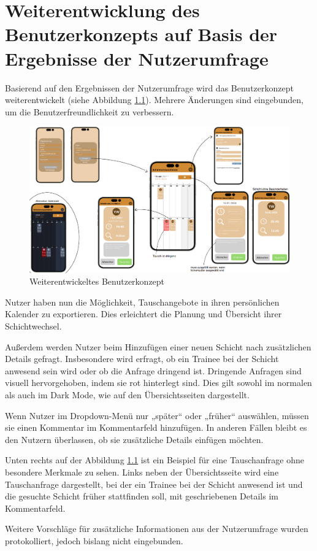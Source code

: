 \chapter{Weiterentwicklung des Benutzerkonzepts auf Basis der Ergebnisse der Nutzerumfrage}

Basierend auf den Ergebnissen der Nutzerumfrage wird das Benutzerkonzept weiterentwickelt (siehe Abbildung \ref{Bedienungskonzept_V2}). Mehrere Änderungen sind eingebunden, um die Benutzerfreundlichkeit zu verbessern.

\begin{figure}[h]
    \centering
    \includegraphics[clip,width=1\linewidth]{images/Bedienungskonzept_V2.png}
    \caption[Weiterentwickeltes Benutzerkonzept]{Weiterentwickeltes Benutzerkonzept}
    \label{Bedienungskonzept_V2}
\end{figure}

Nutzer haben nun die Möglichkeit, Tauschangebote in ihren persönlichen Kalender zu exportieren. Dies erleichtert die Planung und Übersicht ihrer Schichtwechsel.

Außerdem werden Nutzer beim Hinzufügen einer neuen Schicht nach zusätzlichen Details gefragt. Insbesondere wird erfragt, ob ein Trainee bei der Schicht anwesend sein wird oder ob die Anfrage dringend ist. Dringende Anfragen sind visuell hervorgehoben, indem sie rot hinterlegt sind. Dies gilt sowohl im normalen als auch im Dark Mode, wie auf den Übersichtsseiten dargestellt.

Wenn Nutzer im Dropdown-Menü nur „später“ oder „früher“ auswählen, müssen sie einen Kommentar im Kommentarfeld hinzufügen. In anderen Fällen bleibt es den Nutzern überlassen, ob sie zusätzliche Details einfügen möchten.

Unten rechts auf der Abbildung \ref{Bedienungskonzept_V2} ist ein Beispiel für eine Tauschanfrage ohne besondere Merkmale zu sehen. Links neben der Übersichtsseite wird eine Tauschanfrage dargestellt, bei der ein Trainee bei der Schicht anwesend ist und die gesuchte Schicht früher stattfinden soll, mit geschriebenen Details im Kommentarfeld.

Weitere Vorschläge für zusätzliche Informationen aus der Nutzerumfrage wurden protokolliert, jedoch bislang nicht eingebunden.